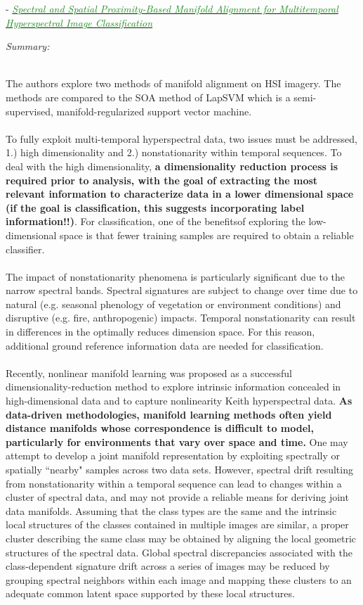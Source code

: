 \documentclass[]{article}
\newcommand{\paperentry}[4]{
            \hangindent=1cm
            \cite{#1} - \href{run:../References/#3}{\textcolor{ForestGreen}{\textit{#2}}}
            
            \noindent            
            \begin{minipage}[t]{0.1\linewidth}\hfill\end{minipage}
            \begin{minipage}[t]{0.8\linewidth}\textcolor{NavyBlue}{{\textit{Summary:}}}#4\end{minipage}
            \vspace{.25cm}
          }
\begin{document}
		\paperentry{Yang2016ManifoldAlignmentMultitemporalHSI}
		{Spectral and Spatial Proximity-Based Manifold Alignment for Multitemporal Hyperspectral Image Classification}
		{Manifold_Representation_Learning/Alignment/Yang2016ManifoldAlignmentMultitemporalHSI.pdf}
		{}\\
		The authors explore two methods of manifold alignment on HSI imagery.  The methods are compared to the SOA  method of LapSVM which is a semi-supervised, manifold-regularized support vector machine.
		\\ \\
		To fully exploit multi-temporal hyperspectral data, two issues must be addressed, 1.) high dimensionality and 2.) nonstationarity within temporal sequences.  To deal with the high dimensionality, \textbf{a dimensionality reduction process is required prior to analysis, with the goal of extracting the most relevant information to characterize data in a lower dimensional space (if the goal is classification, this suggests incorporating label information!!)}.  For classification, one of the benefitsof exploring the low-dimensional space is that fewer training samples are required to obtain a reliable classifier. 
		\\ \\
		The impact of nonstationarity phenomena is particularly significant due to the narrow spectral bands.   Spectral signatures are subject to change over time due to natural (e.g. seasonal phenology of vegetation or environment conditions) and disruptive (e.g. fire, anthropogenic) impacts.  Temporal nonstationarity can result in differences in the optimally reduces dimension space.  For this reason, additional ground reference information data are needed for classification.
		\\ \\
		Recently, nonlinear manifold learning was proposed as a successful dimensionality-reduction method to explore intrinsic information concealed in high-dimensional data and to capture nonlinearity Keith hyperspectral data.  \textbf{As data-driven methodologies, manifold learning methods often yield distance manifolds whose correspondence is difficult to model, particularly for environments that vary over space and time.}  One may attempt to develop a joint manifold representation by exploiting spectrally or spatially ``nearby" samples across two data sets.  However, spectral drift resulting from nonstationarity within a temporal sequence can lead to changes within a cluster of spectral data, and may not provide a reliable means for deriving joint data manifolds.  Assuming that the class types are the same and the intrinsic local structures of the classes contained in multiple images are similar, a proper cluster describing the same class may be obtained by aligning the local geometric structures of the spectral data.  Global spectral discrepancies associated with the class-dependent signature drift across a series of images may be reduced by grouping spectral neighbors within each image and mapping these clusters to an adequate common latent space supported by these local structures.
\end{document}
